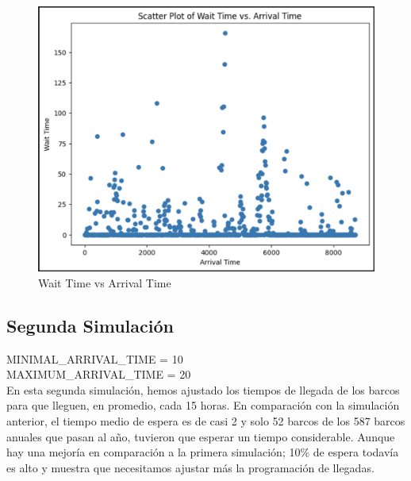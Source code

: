 \documentclass[12pt]{article}
\begin{document}
\begin{figure}[H]
\begin{minipage}{0.5\textwidth}
        \includegraphics[width=\linewidth]{SIMULACION 1.png}  
        \caption{Wait Time vs Arrival Time}
        \label{fig:grafica2}
    \end{minipage}
    \end{figure}
        
    \subsection{Segunda Simulación}
    MINIMAL\_ARRIVAL\_TIME = 10 \\
    MAXIMUM\_ARRIVAL\_TIME = 20 \\
    
    En esta segunda simulación, hemos ajustado los tiempos de llegada de los barcos para que lleguen, en promedio, cada 15 horas. En comparación con la simulación anterior, el tiempo medio de espera es de casi 2 y solo 52 barcos de los 587 barcos anuales que pasan al año, tuvieron que esperar un tiempo considerable. Aunque hay una mejoría en comparación a la primera simulación; 10\% de espera todavía es alto y muestra que necesitamos ajustar más la programación de llegadas.
\end{document}
